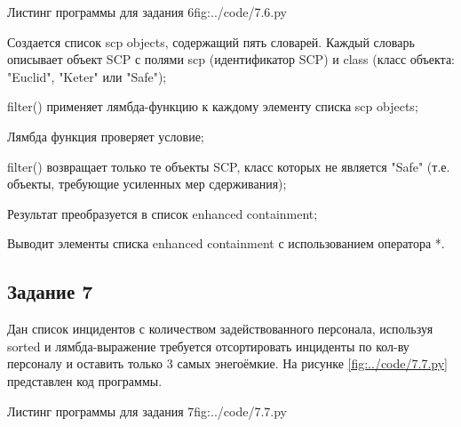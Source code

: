 \documentclass{vvsu}
\begin{document}
\begin{vvsu_figure}{Листинг программы для задания 6}{fig:../code/7.6.py}
  \begin{minipage}{.75\textwidth}
    
  \end{minipage}
\end{vvsu_figure}

\begin{vvsu_list}
  \item Создается список scp objects, содержащий пять словарей. Каждый словарь описывает объект SCP с полями scp (идентификатор SCP) и class (класс объекта: "Euclid", "Keter" или "Safe");
  \item filter() применяет лямбда-функцию к каждому элементу списка scp objects;
  \item Лямбда функция проверяет условие;
  \item filter() возвращает только те объекты SCP, класс которых не является "Safe" (т.е. объекты, требующие усиленных мер сдерживания);
  \item Результат преобразуется в список enhanced containment;
\end{vvsu_list}
  Выводит элементы списка enhanced containment с использованием оператора *.

\subsection{Задание 7}
    Дан список инцидентов с количеством задействованного персонала, используя sorted и лямбда-выражение требуется отсортировать инциденты по кол-ву персоналу и оставить только 3 самых энегоёмкие.
  На рисунке \ref{fig:../code/7.7.py} представлен код программы.

\begin{vvsu_figure}{Листинг программы для задания 7}{fig:../code/7.7.py}
  \begin{minipage}{.75\textwidth}
    
  \end{minipage}
\end{vvsu_figure}
\end{document}
